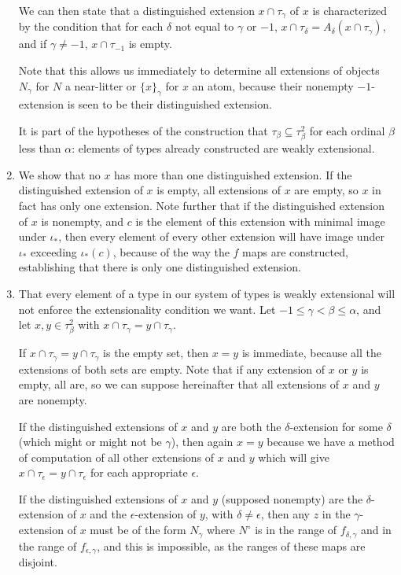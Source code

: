 \documentclass[12pt]{article}
\begin{document}
\begin{enumerate}
We can then state that a distinguished extension $x \cap \tau_\gamma$ of $x$ is characterized by the condition that for each $\delta$ not equal to $\gamma$ or $-1$,
$x \cap \tau_\delta = A_\delta(x \cap \tau_\gamma)$, and if $\gamma \neq -1$, $x \cap \tau_{-1}$ is empty.

Note that this allows us immediately to determine all extensions of objects $N_\gamma$ for $N$ a near-litter or $\{x\}_\gamma$ for $x$ an atom, because their nonempty $-1$-extension is seen to be their distinguished extension.

It is part of the hypotheses of the construction that $\tau_\beta \subseteq \tau^2_\beta$ for each ordinal $\beta$ less than $\alpha$:  elements of types already constructed are weakly extensional.

\item We show that no $x$ has more than one distinguished extension.  If the distinguished extension of $x$ is empty, all extensions of $x$ are empty, so $x$ in fact has only one extension.  Note further that if the distinguished extension of $x$ is nonempty,
and $c$ is the element of this extension with minimal image under $\iota_*$, then every element of every other extension will have image under $\iota_*$ exceeding $\iota_*(c)$, because of the way the $f$ maps are constructed,  establishing that there is only one distinguished extension.

\item  That every element of a type in our system of types is weakly extensional will not enforce the extensionality condition we want.  Let $-1 \leq \gamma < \beta \leq \alpha$, and let
$x,y \in \tau^2_\beta$ with $x \cap \tau_\gamma = y \cap \tau_\gamma$.   

If $x \cap \tau_\gamma = y \cap \tau_\gamma$ is the empty set, then $x=y$ is immediate, because all the extensions of both sets are empty.  Note that if any extension
of $x$ or $y$ is empty, all are, so we can suppose hereinafter that all extensions of $x$ and $y$ are nonempty.

If the distinguished extensions of $x$ and $y$ are both the $\delta$-extension for some $\delta$ (which might or might not be $\gamma$), then again $x=y$ because we have a method of computation of all other extensions of $x$ and $y$ which will give $x \cap \tau_\epsilon = y \cap \tau_\epsilon$ for each appropriate $\epsilon$. 

If the distinguished extensions of $x$ and $y$ (supposed nonempty) are the $\delta$-extension of $x$ and the $\epsilon$-extension of $y$, with $\delta \neq \epsilon$, then any $z$ in the $\gamma$-extension of $x$ must be of the form $N_\gamma$ where $N^\circ$ is in the range of $f_{\delta,\gamma}$ and in the range of $f_{\epsilon,\gamma}$, and this is impossible, as the ranges of these maps are disjoint.


\end{enumerate}
\end{document}
